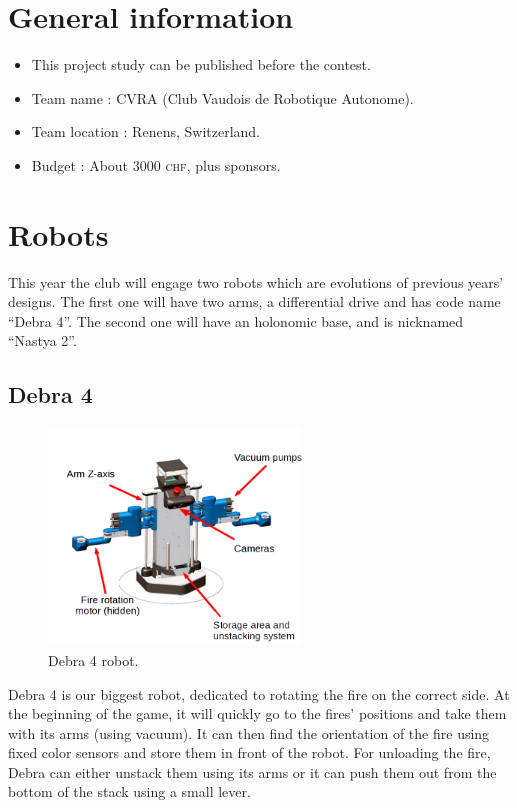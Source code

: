 \documentclass[a4paper]{paper}
\begin{document}

\tableofcontents

\section{General information}
\begin{itemize}
    \item This project study can be published before the contest.
    \item Team name : CVRA (Club Vaudois de Robotique Autonome).
    \item Team location : Renens, Switzerland.
    \item Budget : About 3000 \textsc{chf}, plus sponsors.
\end{itemize}

\section{Robots}
This year the club will engage two robots which are evolutions of previous years' designs.
The first one will have two arms, a differential drive and has code name ``Debra 4''.
The second one will have an holonomic base, and is nicknamed ``Nastya 2''.

\subsection{Debra 4}
\begin{figure}[h]
    \begin{center}
        \includegraphics[width=0.6\textwidth]{images/debra_explained}
        \caption{Debra 4 robot.}
        \label{fig:balise}
    \end{center}
\end{figure}
Debra 4 is our biggest robot, dedicated to rotating the fire on the correct side.
At the beginning of the game, it will quickly go to the fires' positions and take them with its arms (using vacuum).
It can then find the orientation of the fire using fixed color sensors and store them in front of the robot.
For unloading the fire, Debra can either unstack them using its arms or it can push them out from the bottom of the stack using a small lever.
\end{document}
